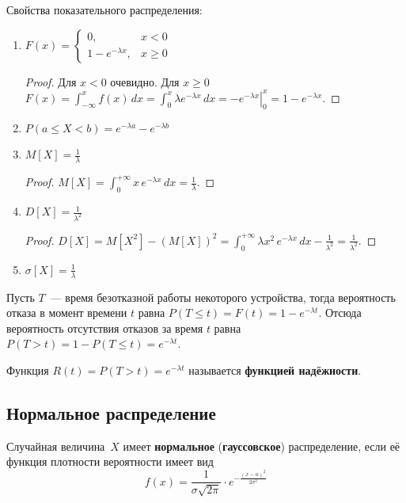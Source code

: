 Свойства показательного распределения:
\begin{enumerate}
	\item $\displaystyle F(x) =
	\begin{cases}
	0, & x < 0 \\
	1 - e^{-\lambda x}, & x \geqslant 0
	\end{cases}$
	\begin{proof}
	Для $x < 0$ очевидно.
	Для $x \geqslant 0$
	$\displaystyle F(x) =
	\int_{-\infty}^x f(x)\,dx =
	\int_0^x \lambda e^{-\lambda x}\,dx =
	\left. -e^{-\lambda x} \right|_0^x =
	1 - e^{-\lambda x}$.
	\end{proof}
	
	\item $\displaystyle P(a \leqslant X < b) = e^{-\lambda a} - e^{-\lambda b}$
	
	\item $\displaystyle M[X] = \frac1\lambda$
	\begin{proof}
	$\displaystyle M[X] =
	\int_0^{+\infty} x\,e^{-\lambda x}\,dx =
	\frac1\lambda$.
	\end{proof}
	
	\item $\displaystyle D[X] = \frac1{\lambda^2}$
	\begin{proof}
	$\displaystyle D[X] =
	M[X^2] - (M[X])^2 =
	\int_0^{+\infty} \lambda x^2\,e^{-\lambda x}\,dx - \frac1{\lambda^2} =
	\frac1{\lambda^2}$.
	\end{proof}
	
	\item $\displaystyle \sigma[X] = \frac1\lambda$
\end{enumerate}

Пусть $T$~--- время безотказной работы некоторого устройства, тогда вероятность отказа в момент времени $t$ равна $P(T \leqslant t) = F(t) = 1 - e^{-\lambda t}$.
Отсюда вероятность отсутствия отказов за время $t$ равна $P(T > t) = 1 - P(T \leqslant t) = e^{-\lambda t}$.

 Функция $R(t) = P(T > t) = e^{-\lambda t}$ называется \textbf{функцией надёжности}.

\subsection{Нормальное распределение}
  Случайная величина~$X$ имеет \textbf{нормальное} (\textbf{гауссовское}) распределение, если её функция плотности вероятности имеет вид
\begin{equation*}
f(x) = \frac1{\sigma \sqrt{2 \pi}} \cdot e^{-\frac{(x - a)^2}{2 \sigma^2}}
\end{equation*}

